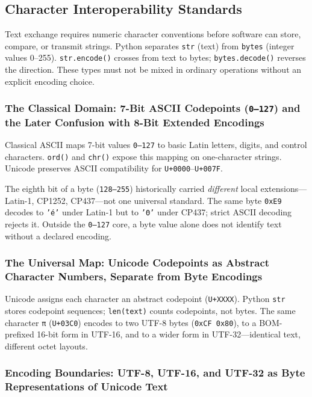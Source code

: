 \subsection{Character Interoperability Standards}

Text exchange requires numeric character conventions before software can store, compare, or transmit strings. Python separates \texttt{str} (text) from \texttt{bytes} (integer values 0--255). \texttt{str.encode()} crosses from text to bytes; \texttt{bytes.decode()} reverses the direction. These types must not be mixed in ordinary operations without an explicit encoding choice.

\subsubsection{The Classical Domain: 7-Bit ASCII Codepoints (\texttt{0--127}) and the Later Confusion with 8-Bit Extended Encodings}

Classical ASCII maps 7-bit values \texttt{0--127} to basic Latin letters, digits, and control characters. \texttt{ord()} and \texttt{chr()} expose this mapping on one-character strings. Unicode preserves ASCII compatibility for \texttt{U+0000}--\texttt{U+007F}.

The eighth bit of a byte (\texttt{128--255}) historically carried \emph{different} local extensions---Latin-1, CP1252, CP437---not one universal standard. The same byte \texttt{0xE9} decodes to \texttt{'é'} under Latin-1 but to \texttt{'Θ'} under CP437; strict ASCII decoding rejects it. Outside the \texttt{0--127} core, a byte value alone does not identify text without a declared encoding.

\subsubsection{The Universal Map: Unicode Codepoints as Abstract Character Numbers, Separate from Byte Encodings}

Unicode assigns each character an abstract codepoint (\texttt{U+XXXX}). Python \texttt{str} stores codepoint sequences; \texttt{len(text)} counts codepoints, not bytes. The same character \texttt{π} (\texttt{U+03C0}) encodes to two UTF-8 bytes (\texttt{0xCF 0x80}), to a BOM-prefixed 16-bit form in UTF-16, and to a wider form in UTF-32---identical text, different octet layouts.

\subsubsection{Encoding Boundaries: UTF-8, UTF-16, and UTF-32 as Byte Representations of Unicode Text}

